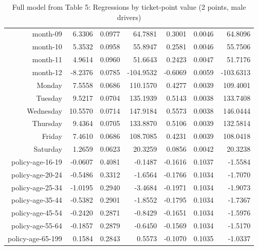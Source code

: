 \documentclass[10pt]{article}
\begin{document}
\begin{table}[ht]
\begin{tabular}{rrrrrrr}
  month-09 & 6.3306 & 0.0977 & 64.7881 & 0.3001 & 0.0046 & 64.8096 \\ 
  month-10 & 5.3532 & 0.0958 & 55.8947 & 0.2581 & 0.0046 & 55.7506 \\ 
  month-11 & 4.9614 & 0.0960 & 51.6643 & 0.2423 & 0.0047 & 51.7176 \\ 
  month-12 & -8.2376 & 0.0785 & -104.9532 & -0.6069 & 0.0059 & -103.6313 \\ 
  Monday & 7.5558 & 0.0686 & 110.1570 & 0.4277 & 0.0039 & 109.4001 \\ 
  Tuesday & 9.5217 & 0.0704 & 135.1939 & 0.5143 & 0.0038 & 133.7408 \\ 
  Wednesday & 10.5570 & 0.0714 & 147.9184 & 0.5573 & 0.0038 & 146.0444 \\ 
  Thursday & 9.4364 & 0.0705 & 133.8870 & 0.5106 & 0.0039 & 132.5814 \\ 
  Friday & 7.4610 & 0.0686 & 108.7085 & 0.4231 & 0.0039 & 108.0418 \\ 
  Saturday & 1.2659 & 0.0623 & 20.3259 & 0.0856 & 0.0042 & 20.3238 \\ 
  policy-age-16-19 & -0.0607 & 0.4081 & -0.1487 & -0.1616 & 0.1037 & -1.5584 \\ 
  policy-age-20-24 & -0.5486 & 0.3312 & -1.6564 & -0.1766 & 0.1034 & -1.7070 \\ 
  policy-age-25-34 & -1.0195 & 0.2940 & -3.4684 & -0.1971 & 0.1034 & -1.9073 \\ 
  policy-age-35-44 & -0.5382 & 0.2901 & -1.8552 & -0.1795 & 0.1034 & -1.7367 \\ 
  policy-age-45-54 & -0.2420 & 0.2871 & -0.8429 & -0.1651 & 0.1034 & -1.5976 \\ 
  policy-age-55-64 & -0.1857 & 0.2879 & -0.6450 & -0.1569 & 0.1034 & -1.5170 \\ 
  policy-age-65-199 & 0.1584 & 0.2843 & 0.5573 & -0.1070 & 0.1035 & -1.0337 \\ 
   \hline
\end{tabular}
\caption{Full model from Table 5: Regressions by ticket-point value (2 points, male drivers)} 
\label{tab_5_2_pts_M}
\end{table}


\clearpage
\pagebreak



\end{document}
